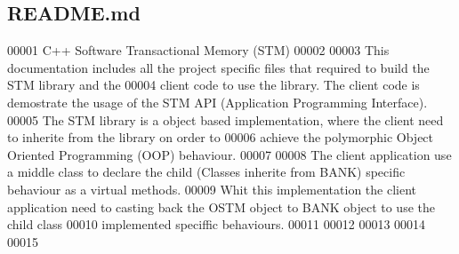 \hypertarget{_r_e_a_d_m_e_8md_source}{}\subsection{R\+E\+A\+D\+M\+E.\+md}

\begin{DoxyCode}
00001 C++ Software Transactional Memory (STM)
00002 
00003 This documentation includes all the project specific files that required to build the STM library and
       the
00004 client code to use the library. The client code is demostrate the usage of the STM API (Application
       Programming Interface).
00005 The STM library is a object based implementation, where the client need to inherite from the library
       on order to
00006 achieve the polymorphic Object Oriented Programming (OOP) behaviour. 
00007 
00008 The client application use a middle class to declare the child (Classes inherite from BANK) specific
       behaviour as a virtual methods. 
00009 Whit this implementation the client application need to casting back the OSTM object to BANK object to
       use the child class
00010 implemented speciffic behaviours.  
00011 
00012 
00013 
00014 
00015 
\end{DoxyCode}
